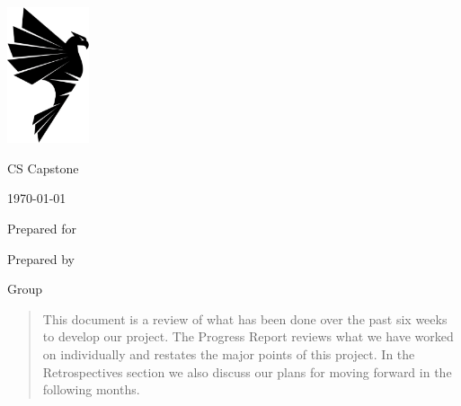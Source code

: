 \begin{singlespace}
\begin{titlepage}
    	\includegraphics[height=4cm]{Shirt_Graphic}
        \hfill 
        \par\vspace{.2in}
        \centering
        \scshape{
            \huge CS Capstone \DocType \par
            {\large\today}\par
            \vspace{.5in}
            \textbf{\Huge\CapstoneProjectName}\par
            \vfill
            {\large Prepared for}\par
            \Huge \CapstoneSponsorCompany\par
            \vspace{5pt}
            {\large Prepared by }\par
            Group\CapstoneTeamNumber\par
            \CapstoneTeamName\par 
            \vspace{5pt}
            {\Large
                \GroupMemberOne \par
                \GroupMemberTwo \par
                \GroupMemberThree \par
            }
            \vspace{20pt}
        }
        \begin{abstract}
        	This document is a review of what has been done over the past six weeks to develop our project. The Progress Report reviews what we have worked on individually and restates the major points of this project. In the Retrospectives section we also discuss our plans for moving forward in the following months.
        \end{abstract}
\end{titlepage}
\newpage
{}
\tableofcontents
\newpage


\end{singlespace}
